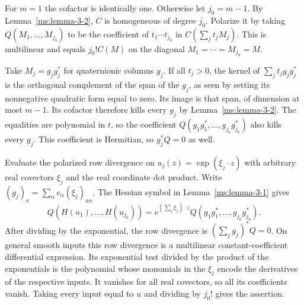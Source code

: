 For $m=1$ the cofactor is identically one. Otherwise let $j_0=m-1$. By Lemma~\ref{ms:lemma-3-2}, $C$ is homogeneous of degree $j_0$. Polarize it by taking $Q(M_1,\ldots,M_{j_0})$ to be the coefficient of $t_1\cdots t_{j_0}$ in $C(\sum_jt_jM_j)$. This is multilinear and equals $j_0!C(M)$ on the diagonal $M_1=\cdots=M_{j_0}=M$.

Take $M_j=g_jg_j^*$ for quaternionic columns $g_j$. If all $t_j>0$, the kernel of $\sum_jt_jg_jg_j^*$ is the orthogonal complement of the span of the $g_j$, as seen by setting its nonnegative quadratic form equal to zero. Its image is that span, of dimension at most $m-1$. Its cofactor therefore kills every $g_j$ by Lemma~\ref{ms:lemma-3-2}. The equalities are polynomial in $t$, so the coefficient $Q(g_1g_1^*,\ldots,g_{j_0}g_{j_0}^*)$ also kills every $g_j$. This coefficient is Hermitian, so $g_j^*Q=0$ as well.

Evaluate the polarized row divergence on $u_j(z)=\exp(\xi_j\cdot z)$ with arbitrary real covectors $\xi_j$ and the real coordinate dot product. Write $(g_j)_a=\sum_\alpha e_\alpha(\xi_j)_{a\alpha}$. The Hessian symbol in Lemma~\ref{ms:lemma-3-1} gives
\[
Q(H(u_1),\ldots,H(u_{j_0}))
=e^{(\sum_j\xi_j)\cdot z}Q(g_1g_1^*,\ldots,g_{j_0}g_{j_0}^*).
\]
After dividing by the exponential, the row divergence is $(\sum_jg_j)^*Q=0$. On general smooth inputs this row divergence is a multilinear constant-coefficient differential expression. Its exponential test divided by the product of the exponentials is the polynomial whose monomials in the $\xi_j$ encode the derivatives of the respective inputs. It vanishes for all real covectors, so all its coefficients vanish. Taking every input equal to $u$ and dividing by $j_0!$ gives the assertion.
